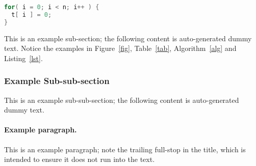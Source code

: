 \begin{lstlisting}[float={t},caption={This is an example listing.},label={lst},language=C]
for( i = 0; i < n; i++ ) {
  t[ i ] = 0;
}
\end{lstlisting}

This is an example sub-section;
the following content is auto-generated dummy text.
Notice the examples in Figure~\ref{fig}, Table~\ref{tab}, Algorithm~\ref{alg}
and Listing~\ref{lst}.
\lipsum

\subsubsection{Example Sub-sub-section}

This is an example sub-sub-section;
the following content is auto-generated dummy text.
\lipsum

\paragraph{Example paragraph.}

This is an example paragraph; note the trailing full-stop in the title,
which is intended to ensure it does not run into the text.
